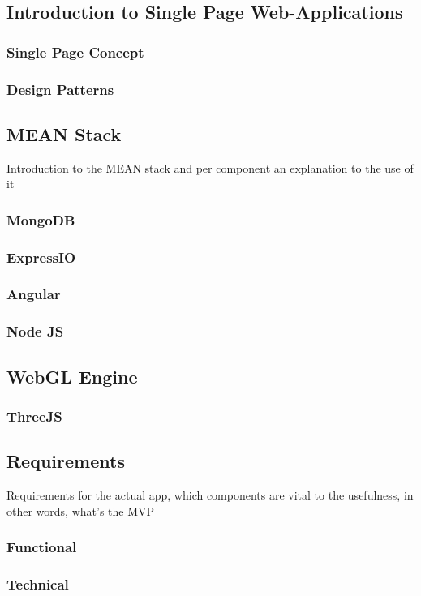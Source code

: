 \documentclass[15pt]{article}
\begin{document}
	\subsection{Introduction to Single Page Web-Applications}
		\subsubsection{Single Page Concept}
		\subsubsection{Design Patterns}
	\subsection{MEAN Stack}
		Introduction to the MEAN stack and per component an explanation to the use of it
		\subsubsection{MongoDB}
		\subsubsection{ExpressIO}
		\subsubsection{Angular}
		\subsubsection{Node JS}
	\subsection{WebGL Engine}
		\subsubsection{ThreeJS}
	\subsection{Requirements}
		Requirements for the actual app, which components are vital to the usefulness, in other words, what's the MVP
		\subsubsection{Functional}
		\subsubsection{Technical}
\end{document}
